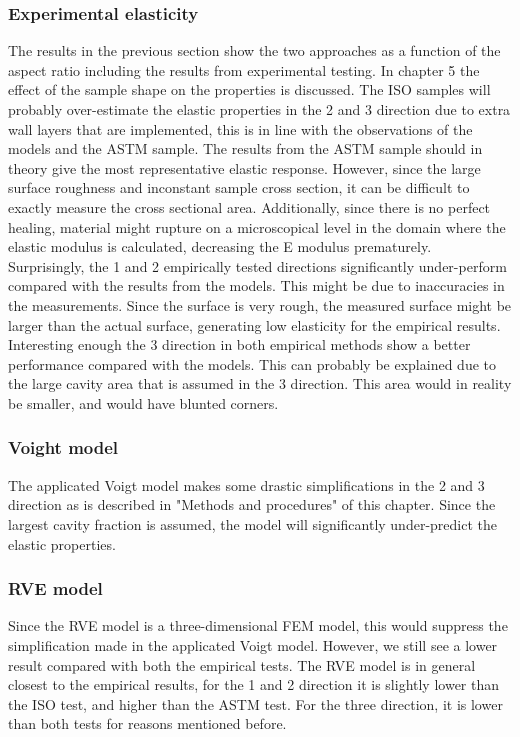 \subsubsection{Experimental elasticity}
The results in the previous section show the two approaches as a function of the aspect ratio including the results from experimental testing. In chapter 5 the effect of the sample shape on the properties is discussed. The ISO samples will probably over-estimate the elastic properties in the 2 and 3 direction due to extra wall layers that are implemented, this is in line with the observations of the models and the ASTM sample. The results from the ASTM sample should in theory give the most representative elastic response. However, since the large surface roughness and inconstant sample cross section, it can be difficult to exactly measure the cross sectional area. Additionally, since there is no perfect healing, material might rupture on a microscopical level in the domain where the elastic modulus is calculated, decreasing the E modulus prematurely.  Surprisingly, the 1 and 2 empirically tested directions significantly under-perform compared with the results from the models. This might be due to inaccuracies in the measurements. Since the surface is very rough, the measured surface might be larger than the actual surface, generating low elasticity for the empirical results. Interesting enough the 3 direction in both empirical methods show a better performance compared with the models. This can probably be explained due to the large cavity area that is assumed in the 3 direction. This area would in reality be smaller, and would have blunted corners. 
\subsubsection{Voight model}
The applicated Voigt model makes some drastic simplifications in the 2 and 3 direction as is described in "Methods and procedures" of this chapter. Since the largest cavity fraction is assumed, the model will significantly under-predict the elastic properties. 
\subsubsection{RVE model}
Since the RVE model is a three-dimensional FEM model, this would suppress the simplification made in the applicated Voigt model. However, we still see a lower result compared with both the empirical tests. The RVE model is in general closest to the empirical results, for the 1 and 2 direction it is slightly lower than the ISO test, and higher than the ASTM test. For the three direction, it is lower than both tests for reasons mentioned before.

